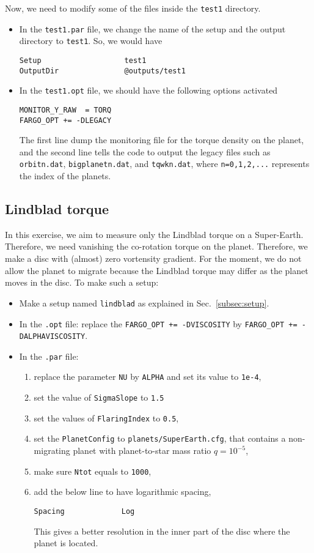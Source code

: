 \documentclass[14pt]{scrartcl}
\begin{document}
Now, we need to modify some of the files inside the \texttt{test1} directory.
\begin{itemize}
    \item In the \texttt{test1.par} file, we change the name of the setup and the output directory to \texttt{test1}. So, we would have 
    \begin{verbatim}
Setup                   test1
OutputDir               @outputs/test1
    \end{verbatim}
    \item In the \texttt{test1.opt} file, we should have the following options activated
    \begin{verbatim}
MONITOR_Y_RAW  = TORQ
FARGO_OPT += -DLEGACY
	\end{verbatim}
The first line dump the monitoring file for the torque density on the planet, and the second line tells the code to output the legacy files such as \texttt{orbitn.dat}, \texttt{bigplanetn.dat}, and \texttt{tqwkn.dat}, where \texttt{n=0,1,2,...} represents the index of the planets.
\end{itemize} 

\subsection{Lindblad torque} \label{subsec:lindblad}
In this exercise, we aim to measure only the Lindblad torque on a Super-Earth. Therefore, we need vanishing the co-rotation torque on the planet. Therefore, we make a disc with (almost) zero vortensity gradient. For the moment, we do not allow the planet to migrate because the Lindblad torque may differ as the planet moves in the disc. To make such a setup:
\begin{itemize}
	\item Make a setup named \texttt{lindblad} as explained in Sec.~\ref{subsec:setup}.
	\item In the \texttt{.opt} file: replace the \texttt{FARGO\_OPT += -DVISCOSITY}  by \texttt{FARGO\_OPT += -DALPHAVISCOSITY}.
	\item In the \texttt{.par} file:
	\begin{enumerate}
	\item replace the parameter \texttt{NU} by \texttt{ALPHA} and set its value to \texttt{1e-4},
	\item set the value of \texttt{SigmaSlope} to \texttt{1.5}
	\item set the values of \texttt{FlaringIndex} to \texttt{0.5},
	\item set the \texttt{PlanetConfig} to \texttt{planets/SuperEarth.cfg}, that contains a non-migrating planet with planet-to-star mass ratio $q=10^{-5}$,
	\item make sure \texttt{Ntot} equals to \texttt{1000},
	\item add the below line to have logarithmic spacing,
	\begin{verbatim}
Spacing             Log
	\end{verbatim}
	This gives a better resolution in the inner part of the disc where the planet is located.
    \end{enumerate} 
\end{itemize}
\end{document}
